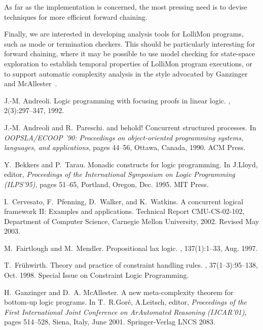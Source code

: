 \documentclass{sig-alt}
\begin{document}
As far as the implementation is concerned, the most pressing need is to
devise techniques for more efficient forward chaining.

Finally, we are interested in developing analysis tools for LolliMon
programs, such as mode or termination checkers.  This should be
particularly interesting for forward chaining, where it may be possible
to use model checking for state-space exploration to establish temporal
properties of LolliMon program executions, or to support automatic
complexity analysis in the style advocated by Ganzinger and
McAllester~\cite{Ganzinger01ijcar}.

\ignore{


}

\begin{thebibliography}{50}
\scriptsize
\vspace*{0.5mm}
J.-M. Andreoli.
\newblock Logic programming with focusing proofs in linear logic.
, 2(3):297--347, 1992.

J.-M. Andreoli and R.~Pareschi.
 and behold! {C}oncurrent structured processes.
\newblock In {\em {OOPSLA/ECOOP} '90: {P}roceedings on object-oriented
  programming systems, languages, and applications}, pages 44--56, Ottawa,
  Canada, 1990. ACM Press.

Y.~Bekkers and P.~Tarau.
\newblock Monadic constructs for logic programming.
\newblock In J.Lloyd, editor, {\em Proceedings of the International Symposium
  on Logic Programming (ILPS'95)}, pages 51--65, Portland, Oregon, Dec. 1995.
  MIT Press.

I.~Cervesato, F.~Pfenning, D.~Walker, and K.~Watkins.
\newblock A concurrent logical framework {II}: Examples and applications.
\newblock Technical Report CMU-CS-02-102, Department of Computer Science,
  Carnegie Mellon University, 2002.
\newblock Revised May 2003.

M.~Fairtlough and M.~Mendler.
\newblock Propositional lax logic.
, 137(1):1--33, Aug. 1997.

T.~Fr{\"u}hwirth.
\newblock Theory and practice of constraint handling rules.
, 37(1--3):95--138, Oct. 1998.
\newblock Special Issue on Constraint Logic Programming.

H.~Ganzinger and D.~A. McAllester.
\newblock A new meta-complexity theorem for bottom-up logic programs.
\newblock In T.~R.Gor{\'e}, A.Leitsch, editor, {\em Proceedings of the First
  International Joint Conference on ArAutomated Reasoning (IJCAR'01)}, pages
  514--528, Siena, Italy, June 2001. Springer-Verlag LNCS 2083.


\end{thebibliography}
\end{document}
